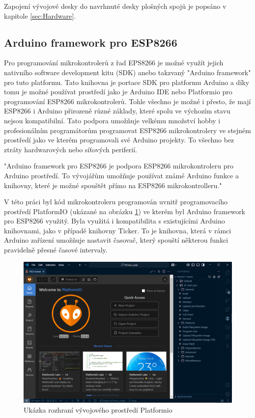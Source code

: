 Zapojení vývojové desky do navrhnuté desky plošných spojů je popsáno v kapitole \ref{sec:Hardware}.

\subsection{Arduino framework pro ESP8266}\label{sec:ArduinoFrameworkForESP8266}

Pro programování mikrokontrolerů z řad EPS8266 je možné využít jejich nativního software development kitu (SDK) anebo takzvaný "Arduino framework" pro tuto platformu. Tato knihovna je portace SDK pro platformu Arduino a díky tomu je možné používat prostředí jako je Arduino IDE nebo Platformio pro programování ESP8266 mikrokontrolerů. Tohle všechno je možné i přesto, že mají ESP8266 i Arduino přirozeně různé základy, které spolu ve výchozím stavu nejsou kompatibilní. Tato podpora umožňuje velkému množství hobby i profesionálním programátorům programovat ESP8266 mikrokontrolery ve stejném prostředí jako ve kterém programovali své Arduino projekty. To všechno bez ztráty hardwarových nebo síťových periferií.

"Arduino framework pro ESP8266 je podpora ESP8266 mikrokontroleru pro Arduino prostředí. To vývojářům umožňuje používat známé Arduino funkce a knihovny, které je možné spouštět přímo na ESP8266 mikrokontrolleru." \cite{ESP8266ArduinoFrameworkGithub}

V této práci byl kód mikrokontroleru programován uvnitř programovacího prostředí PlatformIO (ukázané na obrázku \ref{fig:PlatformioUkazka}) ve kterém byl Arduino framework pro ESP8266 využitý. Byla využitá i kompatibilita s existujícími Arduino knihovnami, jako v případě knihovny Ticker. To je knihovna, která v rámci Arduino zařízení umožňuje nastavit časovač, který spouští některou funkci pravidelně přesné časové intervaly.

\begin{figure}[hptb]
    \centering
    \includegraphics[width=0.9\linewidth]{images/Platformio_Ukazka.png}
    \caption{Ukázka rozhraní vývojového prostředí Platformio}
    \label{fig:PlatformioUkazka}
\end{figure}

